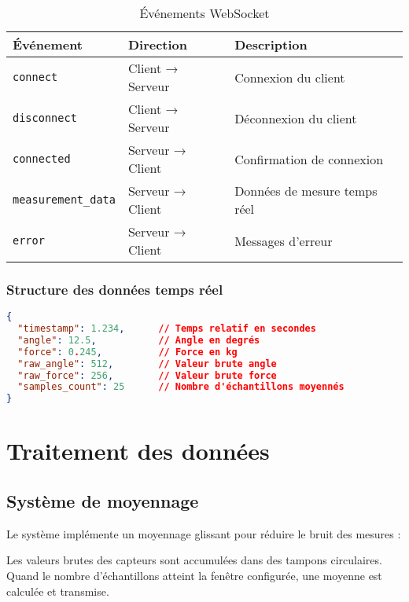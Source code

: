 \documentclass[12pt,a4paper]{article}
\begin{document}
\begin{table}[H]
\centering
\begin{tabular}{|l|l|p{7cm}|}
\hline
\textbf{Événement} & \textbf{Direction} & \textbf{Description} \\
\hline
\texttt{connect} & Client → Serveur & Connexion du client \\
\hline
\texttt{disconnect} & Client → Serveur & Déconnexion du client \\
\hline
\texttt{connected} & Serveur → Client & Confirmation de connexion \\
\hline
\texttt{measurement\_data} & Serveur → Client & Données de mesure temps réel \\
\hline
\texttt{error} & Serveur → Client & Messages d'erreur \\
\hline
\end{tabular}
\caption{Événements WebSocket}
\end{table}

\subsubsection{Structure des données temps réel}

\begin{lstlisting}[language=json, caption=Format des données WebSocket]
{
  "timestamp": 1.234,      // Temps relatif en secondes
  "angle": 12.5,           // Angle en degrés
  "force": 0.245,          // Force en kg
  "raw_angle": 512,        // Valeur brute angle
  "raw_force": 256,        // Valeur brute force
  "samples_count": 25      // Nombre d'échantillons moyennés
}
\end{lstlisting}

\section{Traitement des données}

\subsection{Système de moyennage}

Le système implémente un moyennage glissant pour réduire le bruit des mesures :

\begin{infobox}
Les valeurs brutes des capteurs sont accumulées dans des tampons circulaires. Quand le nombre d'échantillons atteint la fenêtre configurée, une moyenne est calculée et transmise.
\end{infobox}
\end{document}
